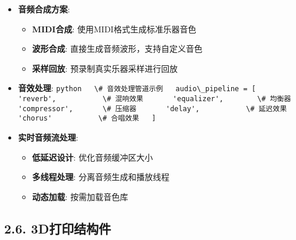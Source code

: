 \begin{itemize}
\item
  \textbf{音频合成方案}:

  \begin{itemize}
  \tightlist
  \item
    \textbf{MIDI合成}: 使用MIDI格式生成标准乐器音色
  \item
    \textbf{波形合成}: 直接生成音频波形，支持自定义音色
  \item
    \textbf{采样回放}: 预录制真实乐器采样进行回放
  \end{itemize}
\item
  \textbf{音效处理}:
  \passthrough{\lstinline!python   \# 音效处理管道示例   audio\_pipeline = [       'reverb',           \# 混响效果       'equalizer',        \# 均衡器       'compressor',       \# 压缩器       'delay',           \# 延迟效果       'chorus'           \# 合唱效果   ]!}
\item
  \textbf{实时音频流处理}:

  \begin{itemize}
  \tightlist
  \item
    \textbf{低延迟设计}: 优化音频缓冲区大小
  \item
    \textbf{多线程处理}: 分离音频生成和播放线程
  \item
    \textbf{动态加载}: 按需加载音色库
  \end{itemize}
\end{itemize}

\subsection{2.6. 3D打印结构件}\label{dux6253ux5370ux7ed3ux6784ux4ef6}


